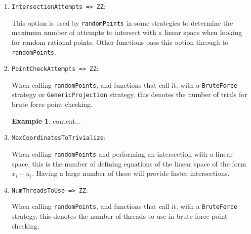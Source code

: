 \documentclass[11pt]{amsart}
\theoremstyle{definition}
\newtheorem{example}{Example}[section]
\begin{document}
\begin{enumerate}
Various functions which produce points, or call functions which produce points, may naturally find scheme theoretic points that are not rational over the base field (for example, by intersecting with a random linear space).  Setting {\tt ExtendField => true} will tell the function that such points are valid.  Setting {\tt ExtendField => false} will tell the function ignore such points.  This sometimes can slow computation, and other times can speed it up.  In some cases, points over extended fields may also have better randomness properties for applications.

\vspace{1em}
\item {\tt IntersectionAttempts => ZZ}: 

This option is used by {\tt randomPoints} in some strategies to determine the maximum number of attempts to intersect with a linear space when looking for random rational points.  Other functions pass this option through to {\tt randomPoints}.

\vspace{1em}
\item{\tt PointCheckAttempts => ZZ}:

 When calling {\tt randomPoints}, and functions that call it, with a {\tt BruteForce} strategy or {\tt GenericProjection} strategy, this denotes the number of trials for brute force point checking.
 
 \begin{example}
 	content...
 \end{example}

\vspace{1em}
\item {\tt MaxCoordinatesToTrivialize}:

When calling {\tt randomPoints} and performing an intersection with a linear space, this is the number of defining equations of the linear space of the form $x_i - a_i$.  Having a large number of these will provide faster intersections.

\vspace{1em}
\item {\tt NumThreadsToUse => ZZ}:

When calling {\tt randomPoints}, and functions that call it, with a {\tt BruteForce} strategy, this denotes the number of threads to use in brute force point checking.
\end{enumerate}
\end{document}
